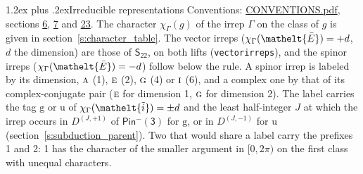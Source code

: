 \documentclass[10pt,a4paper]{article}
\makeatletter
\renewcommand\section{\@startsection{section}{1}{\z@}{-3ex plus -1ex minus -.2ex}%
  {1.2ex plus .2ex}{\normalfont\large\sffamily\bfseries\color{parttitle}}}
\numberwithin{equation}{section}
\newcommand{\eltfont}[1]{{\let\sigma\eltsigma\mathelt{#1}}}
\newcommand{\grp}[1]{\mathsf{#1}}
\newcommand{\irr}[1]{\text{\normalfont\scshape #1}}
\newcommand{\elt}[1]{\eltfont{#1}}
\newcommand{\ptag}[1]{\mathrm{#1}}
\newcommand{\irrJp}[2]{D^{(#1,#2)}}
\newcommand{\irchar}[1]{\chi_{#1}}
\newcommand{\barred}[1]{\bar{#1}}
\newcommand{\lift}[1]{\tilde{#1}}
\makeatother
\begin{document}
\section{Irreducible representations}\label{s:irreps}
Conventions: \href{../../CONVENTIONS.pdf}{CONVENTIONS.pdf}, sections \href{../../../rotation/CONVENTIONS.pdf\#conv.6}{6}, \href{../../../rotation/CONVENTIONS.pdf\#conv.7}{7} and \href{../../CONVENTIONS.pdf\#conv.23}{23}.
\leavevmode\label{n:function.character}\label{n:irrep.Gamma}The character $\irchar{\Gamma}(g)$ of the irrep $\Gamma$ on the class of $g$ is given in section~\ref{s:character_table}. \label{n:index.dimension}The vector irreps ($\irchar{\Gamma}(\elt{\barred{E}}) = +d$, $d$ the dimension) are those of \href{../../../rotation/data/pdf/S22.pdf}{$\grp{S_{22}}$}, on both lifts (\texttt{vectorirreps}), and the spinor irreps ($\irchar{\Gamma}(\elt{\barred{E}}) = -d$) follow below the rule. A spinor irrep is labeled by its dimension, $\irr{a}$ (1), $\irr{e}$ (2), $\irr{g}$ (4) or $\irr{i}$ (6), and a complex one by that of its complex-conjugate pair ($\irr{e}$ for dimension 1, $\irr{g}$ for dimension 2). The label carries the tag $\ptag{g}$ or $\ptag{u}$ of $\irchar{\Gamma}(\elt{\lift{i}}) = \pm d$ and the least half-integer $J$ at which the irrep occurs in $\irrJp{J}{+1}$ of $\grp{Pin^{-}(3)}$ for $\ptag{g}$, or in $\irrJp{J}{-1}$ for $\ptag{u}$ (section~\ref{s:subduction_parent}). Two that would share a label carry the prefixes 1 and 2: 1 has the character of the smaller argument in $[0, 2\pi)$ on the first class with unequal characters.
\end{document}
